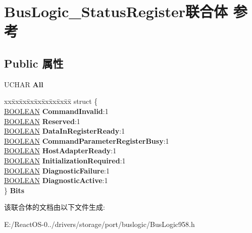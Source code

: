 \hypertarget{union_bus_logic___status_register}{}\section{Bus\+Logic\+\_\+\+Status\+Register联合体 参考}
\label{union_bus_logic___status_register}
\subsection*{Public 属性}
\begin{DoxyCompactItemize}
\item 
\mbox{\label{union_bus_logic___status_register_a0de8ba67a75c1eac1de24e1f46f0cf58}} 
U\+C\+H\+AR {\bfseries All}
\item 
\mbox{\label{union_bus_logic___status_register_a4866cd47465604ce7e0a5a92b3aca992}} 
\begin{tabbing}
xx\=xx\=xx\=xx\=xx\=xx\=xx\=xx\=xx\=\kill
struct \{\\
\>\hyperlink{_processor_bind_8h_a112e3146cb38b6ee95e64d85842e380a}{BOOLEAN} {\bfseries CommandInvalid}:1\\
\>\hyperlink{_processor_bind_8h_a112e3146cb38b6ee95e64d85842e380a}{BOOLEAN} {\bfseries Reserved}:1\\
\>\hyperlink{_processor_bind_8h_a112e3146cb38b6ee95e64d85842e380a}{BOOLEAN} {\bfseries DataInRegisterReady}:1\\
\>\hyperlink{_processor_bind_8h_a112e3146cb38b6ee95e64d85842e380a}{BOOLEAN} {\bfseries CommandParameterRegisterBusy}:1\\
\>\hyperlink{_processor_bind_8h_a112e3146cb38b6ee95e64d85842e380a}{BOOLEAN} {\bfseries HostAdapterReady}:1\\
\>\hyperlink{_processor_bind_8h_a112e3146cb38b6ee95e64d85842e380a}{BOOLEAN} {\bfseries InitializationRequired}:1\\
\>\hyperlink{_processor_bind_8h_a112e3146cb38b6ee95e64d85842e380a}{BOOLEAN} {\bfseries DiagnosticFailure}:1\\
\>\hyperlink{_processor_bind_8h_a112e3146cb38b6ee95e64d85842e380a}{BOOLEAN} {\bfseries DiagnosticActive}:1\\
\} {\bfseries Bits}\\

\end{tabbing}\end{DoxyCompactItemize}


该联合体的文档由以下文件生成\+:\begin{DoxyCompactItemize}
\item 
E\+:/\+React\+O\+S-\/0../drivers/storage/port/buslogic/Bus\+Logic958.\+h\end{DoxyCompactItemize}
